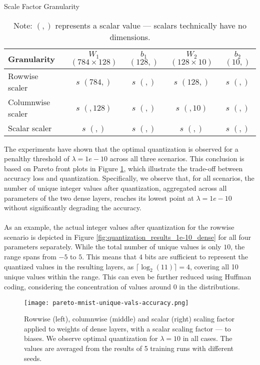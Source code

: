 \begin{table}[h!]
  \centering
  \caption{Scale Factor Granularity}
  \label{tab:scalefactorgranularitydense}
  \begin{tabular}{l|c|c|c|c}
  \hline
  \textbf{Granularity}        & \( W_1 \) \( (784 \times 128) \)       & \( b_1 \) \( (128,) \)        & \( W_2 \) \( (128 \times 10) \)     & \( b_2 \) \( (10,) \) \\ \hline
  Rowwise scaler              & \( s \) \( (784, ) \)                 & \( s \) \( (,) \)             & \( s \) \( (128, ) \)              & \( s \) \( (,) \)     \\ \hline
  Columnwise scaler           & \( s \) \( (,128) \)                  & \( s \) \( (,) \)             & \( s \) \( (,10) \)                & \( s \) \( (,) \)     \\ \hline
  Scalar scaler               & \( s \) \( (,) \)                     & \( s \) \( (,) \)             & \( s \) \( (,) \)                  & \( s \) \( (,) \)     \\ \hline
  \end{tabular}
  \vspace{0.5em}
  \caption*{\footnotesize Note: \( (,) \) represents a scalar value — scalars technically have no dimensions.}
\end{table}

\noindent The experiments have shown that the optimal quantization is observed for a penalthy threshold of 
\( \lambda = 1e-10 \) across all three scenarios.
This conclusion is based on Pareto front plots in Figure \ref{fig:pareto-mnist-unique-vals-accuracy},
which illustrate the trade-off between accuracy loss and quantization.
Specifically, we observe that, for all scenarios, 
the number of unique integer values after quantization, 
aggregated across all parameters of the two dense layers, reaches its lowest point at \( \lambda = 1e-10 \)
without significantly degrading the accuracy.
\\
\\
As an example, the actual integer values after quantization for the rowwise scenario is 
depicted in Figure \ref{fig:quantization_results_1e-10_dense} for all four parameters separately.
While the total number of unique values is only \( 10 \), the range spans from \( -5 \) to \( 5 \).
This means that \( 4 \) bits are sufficient to represent the quantized values in the resulting layers, 
as \( \lceil \log_2(11) \rceil = 4 \), covering all 10 unique values within the range. 
This can even be further reduced using Huffman coding, 
considering the concentration of values around 0 in the distributions.
\\
\begin{figure}[h!]
  \centering
  \texttt{[image: pareto-mnist-unique-vals-accuracy.png]}
  \caption{Rowwise (left), columnwise (middle) and scalar (right) scaling factor applied to weights of dense layers, with a scalar scaling factor — to biases.
  We observe optimal quantization for \( \lambda = 10\)  in all cases. The values are averaged from the results of 5 training runs with different seeds.}
  \label{fig:pareto-mnist-unique-vals-accuracy}
\end{figure}


